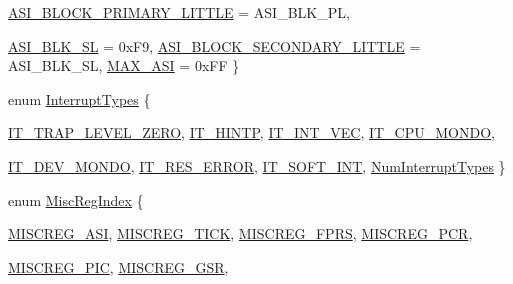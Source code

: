 \begin{DoxyCompactItemize}
\hyperlink{namespaceSparcISA_a6dd43f1311515252b283f56d7095a1f3a6d91906b069ec784c6e70ff4cce72579}{ASI\_\-BLOCK\_\-PRIMARY\_\-LITTLE} =  ASI\_\-BLK\_\-PL, 
\par
\hyperlink{namespaceSparcISA_a6dd43f1311515252b283f56d7095a1f3ade37eebfdc76d9c9e0490ec150f51770}{ASI\_\-BLK\_\-SL} =  0xF9, 
\hyperlink{namespaceSparcISA_a6dd43f1311515252b283f56d7095a1f3a11b0135c5ac3933eff9959cfa208bc1f}{ASI\_\-BLOCK\_\-SECONDARY\_\-LITTLE} =  ASI\_\-BLK\_\-SL, 
\hyperlink{namespaceSparcISA_a6dd43f1311515252b283f56d7095a1f3afda8a3454c74013a9fa9f7db69c29467}{MAX\_\-ASI} =  0xFF
 \}
\item 
enum \hyperlink{namespaceSparcISA_acdad6d81b9a94402ce3979d531ae4f40}{InterruptTypes} \{ \par
\hyperlink{namespaceSparcISA_acdad6d81b9a94402ce3979d531ae4f40a990facc9547cd65bb78a7b1dd3141a47}{IT\_\-TRAP\_\-LEVEL\_\-ZERO}, 
\hyperlink{namespaceSparcISA_acdad6d81b9a94402ce3979d531ae4f40a4f80311c3981b4bb9a2fe0754cde660c}{IT\_\-HINTP}, 
\hyperlink{namespaceSparcISA_acdad6d81b9a94402ce3979d531ae4f40a0807b145d67d73e999f80760688319f6}{IT\_\-INT\_\-VEC}, 
\hyperlink{namespaceSparcISA_acdad6d81b9a94402ce3979d531ae4f40ab235dac7d6f199a238be0404d711b157}{IT\_\-CPU\_\-MONDO}, 
\par
\hyperlink{namespaceSparcISA_acdad6d81b9a94402ce3979d531ae4f40ae9f79440d594cb7eeac7d823720a62c8}{IT\_\-DEV\_\-MONDO}, 
\hyperlink{namespaceSparcISA_acdad6d81b9a94402ce3979d531ae4f40a39403fc273d5b050460c6a0f03a8e1e7}{IT\_\-RES\_\-ERROR}, 
\hyperlink{namespaceSparcISA_acdad6d81b9a94402ce3979d531ae4f40a8894b9db1ea658e61aabcfc0a8d50616}{IT\_\-SOFT\_\-INT}, 
\hyperlink{namespaceSparcISA_acdad6d81b9a94402ce3979d531ae4f40a2c6432ad9b7436e1bf24e9e795c49d50}{NumInterruptTypes}
 \}
\item 
enum \hyperlink{namespaceSparcISA_a1e522017e015d4c7efd6b2360143aa67}{MiscRegIndex} \{ \par
\hyperlink{namespaceSparcISA_a1e522017e015d4c7efd6b2360143aa67a5b31a66cbee13241f5c1ccf56f80653d}{MISCREG\_\-ASI}, 
\hyperlink{namespaceSparcISA_a1e522017e015d4c7efd6b2360143aa67a3aec7a111c8a1c741ec91d6e530b263d}{MISCREG\_\-TICK}, 
\hyperlink{namespaceSparcISA_a1e522017e015d4c7efd6b2360143aa67a1b7a86976218e908c55fc8c3e5c6e717}{MISCREG\_\-FPRS}, 
\hyperlink{namespaceSparcISA_a1e522017e015d4c7efd6b2360143aa67a831bcb4e8ff69844e21bd839cf214608}{MISCREG\_\-PCR}, 
\par
\hyperlink{namespaceSparcISA_a1e522017e015d4c7efd6b2360143aa67a3ef2baf5d1045c10bbfde7c0101795ab}{MISCREG\_\-PIC}, 
\hyperlink{namespaceSparcISA_a1e522017e015d4c7efd6b2360143aa67a74228d6b7d68e171082cbbbd2d2e22fb}{MISCREG\_\-GSR}, 

\end{DoxyCompactItemize}
